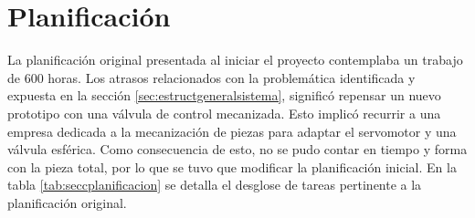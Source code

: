 \section{Planificación}
\label{sec:planificacion}
La planificación original presentada al iniciar el proyecto contemplaba un trabajo de 600 horas. Los atrasos relacionados con la problemática identificada y expuesta en la sección \ref{sec:estructgeneralsistema}, significó repensar un nuevo prototipo con una válvula de control  mecanizada. Esto implicó recurrir a una empresa dedicada a la mecanización de piezas para adaptar el servomotor y una válvula esférica. Como consecuencia de esto, no se pudo contar en tiempo y forma con la pieza total, por lo que se tuvo que modificar la planificación inicial. 
En la tabla \ref{tab:seccplanificacion} se detalla el desglose de tareas pertinente a la planificación original. 
